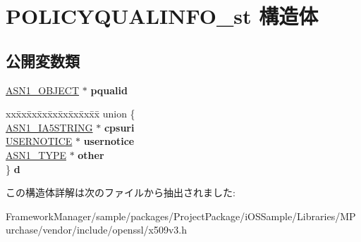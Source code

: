 \hypertarget{struct_p_o_l_i_c_y_q_u_a_l_i_n_f_o__st}{}\section{P\+O\+L\+I\+C\+Y\+Q\+U\+A\+L\+I\+N\+F\+O\+\_\+st 構造体}
\label{struct_p_o_l_i_c_y_q_u_a_l_i_n_f_o__st}
\subsection*{公開変数類}
\begin{DoxyCompactItemize}
\item 
\hypertarget{struct_p_o_l_i_c_y_q_u_a_l_i_n_f_o__st_a88696c938a44a9aa5d6eeb4b326beb10}{}\hyperlink{structasn1__object__st}{A\+S\+N1\+\_\+\+O\+B\+J\+E\+C\+T} $\ast$ {\bfseries pqualid}\label{struct_p_o_l_i_c_y_q_u_a_l_i_n_f_o__st_a88696c938a44a9aa5d6eeb4b326beb10}

\item 
\hypertarget{struct_p_o_l_i_c_y_q_u_a_l_i_n_f_o__st_ade1aba735f0a22a1f8d3c7a7e8102022}{}\begin{tabbing}
xx\=xx\=xx\=xx\=xx\=xx\=xx\=xx\=xx\=\kill
union \{\\
\>\hyperlink{structasn1__string__st}{ASN1\_IA5STRING} $\ast$ {\bfseries cpsuri}\\
\>\hyperlink{struct_u_s_e_r_n_o_t_i_c_e__st}{USERNOTICE} $\ast$ {\bfseries usernotice}\\
\>\hyperlink{structasn1__type__st}{ASN1\_TYPE} $\ast$ {\bfseries other}\\
\} {\bfseries d}\label{struct_p_o_l_i_c_y_q_u_a_l_i_n_f_o__st_ade1aba735f0a22a1f8d3c7a7e8102022}
\\

\end{tabbing}\end{DoxyCompactItemize}


この構造体詳解は次のファイルから抽出されました\+:\begin{DoxyCompactItemize}
\item 
Framework\+Manager/sample/packages/\+Project\+Package/i\+O\+S\+Sample/\+Libraries/\+M\+Purchase/vendor/include/openssl/x509v3.\+h\end{DoxyCompactItemize}
